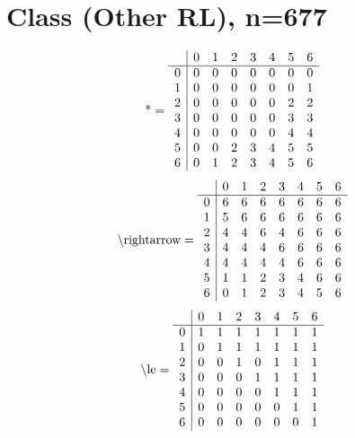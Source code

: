 \documentclass[11pt]{article}
\begin{document}
\section{Class (Other RL), n=677}
\[\text{*} = 
\begin{array}{r | r r r r r r r}
 & 0 & 1 & 2 & 3 & 4 & 5 & 6 \\ \hline
0 & 0 & 0 & 0 & 0 & 0 & 0 & 0 \\
1 & 0 & 0 & 0 & 0 & 0 & 0 & 1 \\
2 & 0 & 0 & 0 & 0 & 0 & 2 & 2 \\
3 & 0 & 0 & 0 & 0 & 0 & 3 & 3 \\
4 & 0 & 0 & 0 & 0 & 0 & 4 & 4 \\
5 & 0 & 0 & 2 & 3 & 4 & 5 & 5 \\
6 & 0 & 1 & 2 & 3 & 4 & 5 & 6 \\
\end{array}
\]
\[\text{\textbackslash rightarrow} = 
\begin{array}{r | r r r r r r r}
 & 0 & 1 & 2 & 3 & 4 & 5 & 6 \\ \hline
0 & 6 & 6 & 6 & 6 & 6 & 6 & 6 \\
1 & 5 & 6 & 6 & 6 & 6 & 6 & 6 \\
2 & 4 & 4 & 6 & 4 & 6 & 6 & 6 \\
3 & 4 & 4 & 4 & 6 & 6 & 6 & 6 \\
4 & 4 & 4 & 4 & 4 & 6 & 6 & 6 \\
5 & 1 & 1 & 2 & 3 & 4 & 6 & 6 \\
6 & 0 & 1 & 2 & 3 & 4 & 5 & 6 \\
\end{array}
\]
\[\text{\textbackslash le} = 
\begin{array}{r | r r r r r r r}
 & 0 & 1 & 2 & 3 & 4 & 5 & 6 \\ \hline
0 & 1 & 1 & 1 & 1 & 1 & 1 & 1 \\
1 & 0 & 1 & 1 & 1 & 1 & 1 & 1 \\
2 & 0 & 0 & 1 & 0 & 1 & 1 & 1 \\
3 & 0 & 0 & 0 & 1 & 1 & 1 & 1 \\
4 & 0 & 0 & 0 & 0 & 1 & 1 & 1 \\
5 & 0 & 0 & 0 & 0 & 0 & 1 & 1 \\
6 & 0 & 0 & 0 & 0 & 0 & 0 & 1 \\
\end{array}
\]
\end{document}
